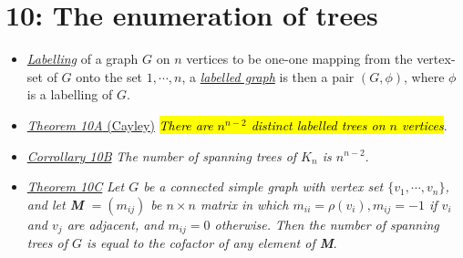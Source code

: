 \documentclass[12pt,a4paper, twocolumn]{article}
\begin{document}
\begin{itemize}
	
	\end{itemize}
	
\section*{10: The enumeration of trees}
\begin{itemize}
	\item \underline{\emph{\color{magenta} Labelling}} of a graph $G$ on $n$ vertices to be one-one mapping from the vertex-set of $G$ onto the set ${1, \cdots ,n}$, a \underline{\emph{\color{magenta} labelled graph}} is then a pair $(G, \phi)$, where $\phi$ is a labelling of $G$.
	\item \underline{\emph{\color{magenta}Theorem 10A} (Cayley)} \hl{\emph{There are $n^{n-2}$ distinct labelled trees on $n$ vertices}}.
	\item \underline{\emph{\color{magenta}Corrollary 10B}} \emph{The number of spanning trees of $K_n$ is $n^{n-2}$}.
	\item \underline{\emph{\color{magenta}Theorem 10C}} \emph{Let $G$ be a connected simple graph with vertex set $\{v_1,\cdots,v_n \}$, and let \textbf{M} $= (m_{ij})$ be $n \times n$ matrix in which $m_{ii} = \rho(v_i), m_{ij} = -1 $ if $v_i$ and $v_j$ are adjacent, and $m_{ij}=0$ otherwise. Then the number of spanning trees of $G$ is equal to the cofactor of any element of \textbf{M}}.	
\end{itemize}
\end{document}
